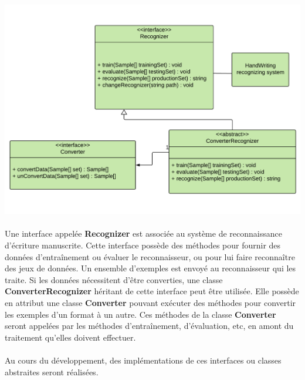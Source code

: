 \paragraph{}

\begin{mdframed}[frametitle={Figure 14 : Diagramme de classes de l'interface avec le système de reconnaissance d'écriture manuscrite}, innerbottommargin=10]
\begin{center}
\includegraphics[scale=0.5]{interface-reconnaisseur.pdf}
\end{center}
\end{mdframed}

\paragraph{}
Une interface appelée \textbf{Recognizer} est associée au système de
reconnaissance d’écriture manuscrite. Cette interface possède des méthodes
pour fournir des données d'entraînement ou  évaluer le reconnaisseur, ou pour lui faire reconnaître
des jeux de données. Un ensemble d’exemples est envoyé au reconnaisseur qui
les traite. Si les données nécessitent d’être converties, une classe
\textbf{ConverterRecognizer} héritant de cette interface peut être utilisée.
Elle possède en attribut une classe \textbf{Converter} pouvant exécuter des
méthodes pour convertir les exemples d’un format à un autre. Ces méthodes de
la classe \textbf{Converter} seront appelées par les méthodes d’entraînement,
d’évaluation, etc, en amont du traitement qu’elles doivent effectuer.

\paragraph{}
Au cours du développement, des implémentations de ces interfaces ou classes
abstraites seront réalisées.

